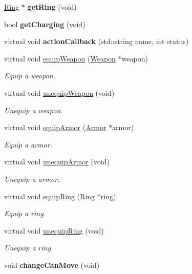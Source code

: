 \begin{DoxyCompactItemize}
\item 
\hypertarget{class_characters_a8157386c316d3892261bf7418b1a52fe}{\hyperlink{class_ring}{Ring} $\ast$ {\bfseries get\+Ring} (void)}\label{class_characters_a8157386c316d3892261bf7418b1a52fe}

\item 
\hypertarget{class_characters_a6af7bcfba27cba1b2fc4483b28b1b208}{bool {\bfseries get\+Charging} (void)}\label{class_characters_a6af7bcfba27cba1b2fc4483b28b1b208}

\item 
\hypertarget{class_characters_a76e565eca6d40dc04119697e1218d24d}{virtual void {\bfseries action\+Callback} (std\+::string name, int status)}\label{class_characters_a76e565eca6d40dc04119697e1218d24d}

\item 
virtual void \hyperlink{class_characters_a99ea3219f0784f29306bfe539301b83a}{equip\+Weapon} (\hyperlink{class_weapon}{Weapon} $\ast$weapon)
\begin{DoxyCompactList}\small\item\em Equip a weapon. \end{DoxyCompactList}\item 
virtual void \hyperlink{class_characters_a9882ae38fa50bb350ca43c583900cc1e}{unequip\+Weapon} (void)
\begin{DoxyCompactList}\small\item\em Unequip a weapon. \end{DoxyCompactList}\item 
virtual void \hyperlink{class_characters_ad2eb0b50918dd57675936744a89c47f9}{equip\+Armor} (\hyperlink{class_armor}{Armor} $\ast$armor)
\begin{DoxyCompactList}\small\item\em Equip a armor. \end{DoxyCompactList}\item 
virtual void \hyperlink{class_characters_a5bf694c35558aa806948ac60c1bcd21b}{unequip\+Armor} (void)
\begin{DoxyCompactList}\small\item\em Unequip a armor. \end{DoxyCompactList}\item 
virtual void \hyperlink{class_characters_a026f9ddf8d01ca42295395b9142de6bc}{equip\+Ring} (\hyperlink{class_ring}{Ring} $\ast$ring)
\begin{DoxyCompactList}\small\item\em Equip a ring. \end{DoxyCompactList}\item 
virtual void \hyperlink{class_characters_a0e81074b82dab6924b1ac257147373d6}{unequip\+Ring} (void)
\begin{DoxyCompactList}\small\item\em Unequip a ring. \end{DoxyCompactList}\item 
\hypertarget{class_characters_a542fa5bfc689011ccc0c4cc4edc9d32a}{void {\bfseries change\+Can\+Move} (void)}\label{class_characters_a542fa5bfc689011ccc0c4cc4edc9d32a}


\end{DoxyCompactItemize}
